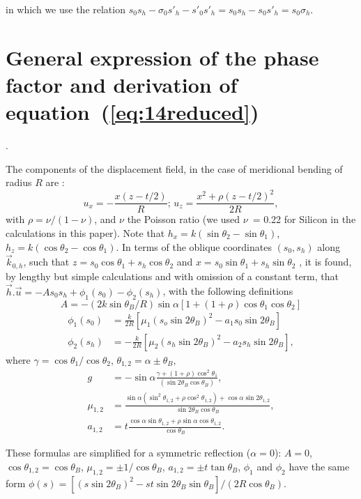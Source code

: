 \documentclass[preprint]{iucr}              %
\newcommand{\inred}[1]{{\color{red}#1}}
\begin{document}
in which we use  the relation $s_0s_h-\sigma_0 s'_h - s'_0 s'_h=s_0 s_h - s_0 s'_h = s_0 \sigma_h$.

\section{General expression of the phase factor and derivation of equation~(\ref{eq:14reduced})}
\label{appendix:Deformation}.

The components of the displacement field, in the case of meridional bending of radius $R$ are \cite{Nesterets}:
\begin{equation}
    u_x = -\frac{x(z-t/2)}{R}; \, u_z=\frac{x^2+\rho(z-t/2)^2}{2R},
\end{equation}
with $\rho=\nu/(1-\nu)$, and $\nu$ the Poisson ratio (we used $\nu$~= 0.22 for Silicon in the calculations in this paper). 
Note that $h_x=k(\sin\theta_2-\sin\theta_1)$, $h_z=k(\cos\theta_2-\cos\theta_1)$.
In terms of the oblique coordinates $(s_0,s_h)$ along $\vec k_{0,h}$, such that $z=s_0\cos\theta_1 + s_h \cos\theta_2$ and $x=s_0 \sin\theta_1+s_h\sin\theta_2$ , 
it is found, by lengthy but simple calculations and with omission of a constant term, that $\vec h.\vec u=-A s_0 s_h + \phi_1(s_0) -\phi_2(s_h)$,  
with the following definitions
\begin{equation}
    A = -(2 k \sin\theta_B /R)\sin\alpha[1+(1+\rho)\cos\theta_1\cos\theta_2]
\end{equation}
\begin{align}
    \phi_1(s_0) &= \frac{k}{2R}[\mu_1(s_o\sin2\theta_B)^2-a_1 s_0\sin2\theta_B] \nonumber \\
    \phi_2(s_h) &= -\frac{k}{2R}[\mu_2(s_h\sin2\theta_B)^2-a_2 s_h\sin2\theta_B],
\end{align}
where $\gamma=\cos\theta_1/\cos\theta_2$, $\theta_{1,2}=\alpha\pm \theta_B$,
\begin{align}
   g &= -\sin\alpha\frac{\gamma +(1+\rho)\cos^2\theta_1}{(\sin2\theta_B\cos\theta_B)}, \nonumber \\
   \mu_{1,2} &=\frac{\sin\alpha(\sin^2\theta_{1,2}+\rho\cos^2\theta_{1,2})+\cos\alpha\sin2\theta_{1,2}}{\sin2\theta_B\cos\theta_B}, \nonumber \\
   a_{1,2} &=t\frac{\cos\alpha\sin\theta_{1,2}+\rho\sin\alpha\cos\theta_{1,2}}{\cos\theta_B}. \nonumber
\end{align}

These formulas are simplified for a symmetric reflection ($\alpha=0$):
$A=0$, $\cos\theta_{1,2}=\cos\theta_B$, $\mu_{1,2}=\pm1/\cos\theta_B$, $a_{1,2}=\pm t\tan\theta_B$, $\phi_1$ and  $\phi_2$ have the same form $\phi(s)=[(s\sin2\theta_B)^2-s t \sin2\theta_B\sin\theta_B] / (2 R \cos\theta_B)$. 
\end{document}
